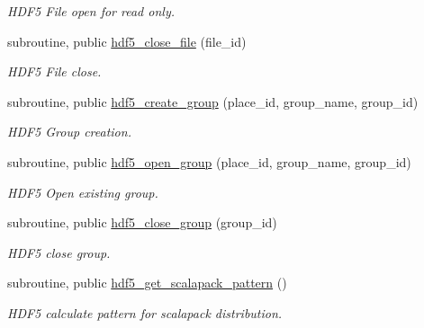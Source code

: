 \begin{DoxyCompactItemize}
\begin{DoxyCompactList}\small\item\em H\+D\+F5 File open for read only. \end{DoxyCompactList}\item 
\hypertarget{namespacehdf5__tools_aaf4e4c8406efe3ed249209d9e6b39126}{}subroutine, public \hyperlink{namespacehdf5__tools_aaf4e4c8406efe3ed249209d9e6b39126}{hdf5\+\_\+close\+\_\+file} (file\+\_\+id)\label{namespacehdf5__tools_aaf4e4c8406efe3ed249209d9e6b39126}

\begin{DoxyCompactList}\small\item\em H\+D\+F5 File close. \end{DoxyCompactList}\item 
\hypertarget{namespacehdf5__tools_ad7df92796ca49e54076d4c8cfaa5e1c8}{}subroutine, public \hyperlink{namespacehdf5__tools_ad7df92796ca49e54076d4c8cfaa5e1c8}{hdf5\+\_\+create\+\_\+group} (place\+\_\+id, group\+\_\+name, group\+\_\+id)\label{namespacehdf5__tools_ad7df92796ca49e54076d4c8cfaa5e1c8}

\begin{DoxyCompactList}\small\item\em H\+D\+F5 Group creation. \end{DoxyCompactList}\item 
\hypertarget{namespacehdf5__tools_a57a6e9277bbef78fd0cd86786b2c4371}{}subroutine, public \hyperlink{namespacehdf5__tools_a57a6e9277bbef78fd0cd86786b2c4371}{hdf5\+\_\+open\+\_\+group} (place\+\_\+id, group\+\_\+name, group\+\_\+id)\label{namespacehdf5__tools_a57a6e9277bbef78fd0cd86786b2c4371}

\begin{DoxyCompactList}\small\item\em H\+D\+F5 Open existing group. \end{DoxyCompactList}\item 
\hypertarget{namespacehdf5__tools_a18ebd57f31e80cb9a7e57a5c432b8d92}{}subroutine, public \hyperlink{namespacehdf5__tools_a18ebd57f31e80cb9a7e57a5c432b8d92}{hdf5\+\_\+close\+\_\+group} (group\+\_\+id)\label{namespacehdf5__tools_a18ebd57f31e80cb9a7e57a5c432b8d92}

\begin{DoxyCompactList}\small\item\em H\+D\+F5 close group. \end{DoxyCompactList}\item 
\hypertarget{namespacehdf5__tools_a86226928a5bf9aed9226319ad2b811fd}{}subroutine, public \hyperlink{namespacehdf5__tools_a86226928a5bf9aed9226319ad2b811fd}{hdf5\+\_\+get\+\_\+scalapack\+\_\+pattern} ()\label{namespacehdf5__tools_a86226928a5bf9aed9226319ad2b811fd}

\begin{DoxyCompactList}\small\item\em H\+D\+F5 calculate pattern for scalapack distribution. \end{DoxyCompactList}\end{DoxyCompactItemize}
